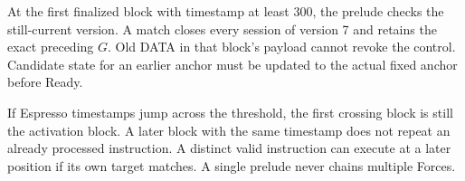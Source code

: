At the first finalized block with timestamp at least 300, the prelude
checks the still-current version. A match closes every session of
version 7 and retains the exact preceding $G$. Old DATA in that block's
payload cannot revoke the control. Candidate state for an earlier
anchor must be updated to the actual fixed anchor before Ready.

If Espresso timestamps jump across the threshold, the first crossing
block is still the activation block. A later block with the same
timestamp does not repeat an already processed instruction. A distinct
valid instruction can execute at a later position if its own target
matches. A single prelude never chains multiple Forces.
